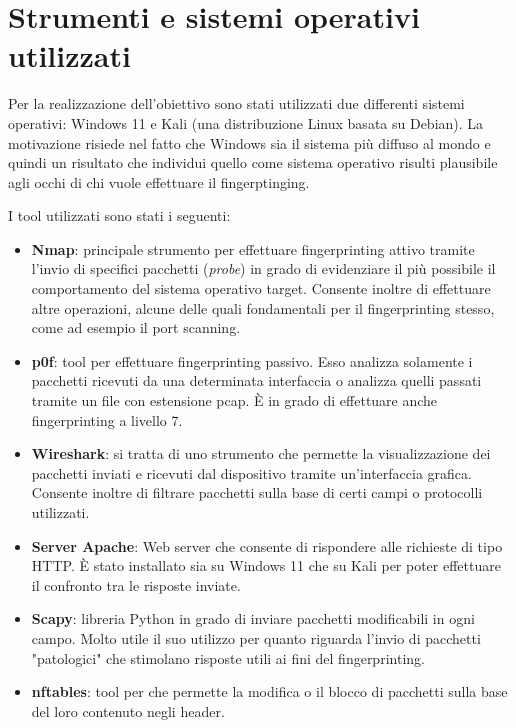 \section{Strumenti e sistemi operativi utilizzati}
Per la realizzazione dell'obiettivo sono stati utilizzati due differenti sistemi operativi: Windows 11 e Kali (una distribuzione Linux basata su Debian).
La motivazione risiede nel fatto che Windows sia il sistema più diffuso al mondo e quindi un risultato che individui quello come sistema operativo risulti plausibile agli occhi di chi vuole effettuare il fingerptinging.

I tool utilizzati sono stati i seguenti:
\begin{itemize}
	\item \textbf{Nmap}: principale strumento per effettuare fingerprinting attivo tramite l'invio di specifici pacchetti (\textit{probe})  in grado di evidenziare il più possibile il comportamento del sistema operativo target. Consente inoltre di effettuare altre operazioni, alcune delle quali fondamentali per il fingerprinting stesso, come ad esempio il port scanning.
	\item \textbf{p0f}: tool per effettuare fingerprinting passivo. Esso analizza solamente i pacchetti ricevuti da una determinata interfaccia o analizza quelli passati tramite un file con estensione pcap. È in grado di effettuare anche fingerprinting a livello 7.
	\item \textbf{Wireshark}: si tratta di uno strumento che permette la visualizzazione dei pacchetti inviati e ricevuti dal dispositivo tramite un'interfaccia grafica. Consente inoltre di filtrare pacchetti sulla base di certi campi o protocolli utilizzati.
	\item \textbf{Server Apache}: Web server che consente di rispondere alle richieste di tipo HTTP. È stato installato sia su Windows 11 che su Kali per poter effettuare il confronto tra le risposte inviate.
	\item \textbf{Scapy}: libreria Python in grado di inviare pacchetti modificabili in ogni campo. Molto utile il suo utilizzo per quanto riguarda l'invio di pacchetti "patologici" che stimolano risposte utili ai fini del fingerprinting.
	\item \textbf{nftables}: tool per che permette la modifica o il blocco di pacchetti sulla base del loro contenuto negli header.
\end{itemize}

	






